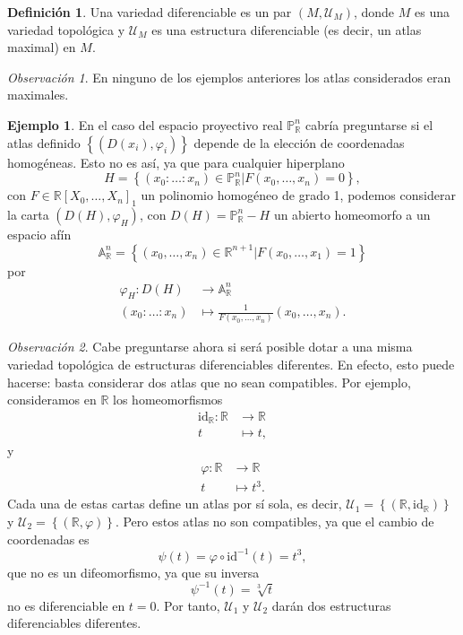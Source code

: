 \documentclass[12pt,a4paper]{book}
\theoremstyle{definition} \newtheorem{defn}[thm]{Definición}
\theoremstyle{definition} \newtheorem{ejemplo}[thm]{Ejemplo}
\theoremstyle{definition} \newtheorem{ejercicio}[thm]{Ejercicio}
\theoremstyle{remark} \newtheorem*{obs}{Observación}
\def\RR{\mathbb{R}}
\def\PP{\mathbb{P}}
\def\id{\mathrm{id}}
\begin{document}
\begin{defn}
  Una variedad diferenciable es un par $(M,\mathcal{U}_M)$, donde $M$ es una variedad topológica y $\mathcal{U}_M$ es una estructura diferenciable (es decir, un atlas maximal) en $M$.
\end{defn}

\begin{obs}
  En ninguno de los ejemplos anteriores los atlas considerados eran maximales.
\end{obs}
  
\begin{ejemplo}
  En el caso del espacio proyectivo real $\PP^n_\RR$ cabría preguntarse si el atlas definido $\left\{ (D(x_i),\varphi_i) \right\}$ depende de la elección de coordenadas homogéneas. Esto no es así, ya que para cualquier hiperplano 
  \begin{equation*}
    H=\left\{ (x_0:\dots:x_n) \in \PP^n_\RR | F(x_0,\dots,x_n)=0 \right\},
  \end{equation*}
  con $F\in \RR[X_0,\dots,X_n]_1$ un polinomio homogéneo de grado 1, podemos considerar la carta $(D(H),\varphi_H)$, con $D(H)=\PP^n_\RR - H$ un abierto homeomorfo a un espacio afín 
  \begin{equation*}
    \mathbb{A}_\RR^n=\left\{ (x_0,\dots,x_n) \in \RR^{n+1} | F(x_0,\dots,x_1)=1 \right\}
  \end{equation*}
  por
  \begin{align*}
    \varphi_H :D(H)&\longrightarrow \mathbb{A}_\RR^n\\ 
    (x_0:\dots:x_n) &\longmapsto \frac{1}{F(x_0,\dots,x_n)}(x_0,\dots,x_n).
    \end{align*}
\end{ejemplo}

    \begin{obs}
      Cabe preguntarse ahora si será posible dotar a una misma variedad topológica de estructuras diferenciables diferentes. En efecto, esto puede hacerse: basta considerar dos atlas que no sean compatibles. Por ejemplo, consideramos en $\RR$ los homeomorfismos
      \begin{align*}
	\id_\RR:\RR&\longrightarrow \RR\\ 
	  t &\longmapsto t, 
	\end{align*}
	y
	\begin{align*}
	  \varphi :\RR&\longrightarrow \RR\\ 
	    t &\longmapsto t^3. 
	  \end{align*}
	  Cada una de estas cartas define un atlas por sí sola, es decir, $\mathcal{U}_1=\left\{ (\RR,\id_{\RR}) \right\}$ y $\mathcal{U}_2=\left\{ (\RR,\varphi) \right\}$. Pero estos atlas no son compatibles, ya que el cambio de coordenadas es
	  \begin{equation*}
	    \psi(t)=\varphi\circ \id^{-1} (t)= t^3,
	  \end{equation*}
	  que no es un difeomorfismo, ya que su inversa
	  \begin{equation*}
	    \psi^{-1}(t)=\sqrt[3]{t}
	  \end{equation*}
	  no es diferenciable en $t=0$. Por tanto, $\mathcal{U}_1$ y $\mathcal{U}_2$ darán dos estructuras diferenciables diferentes.
    \end{obs}
\end{document}
